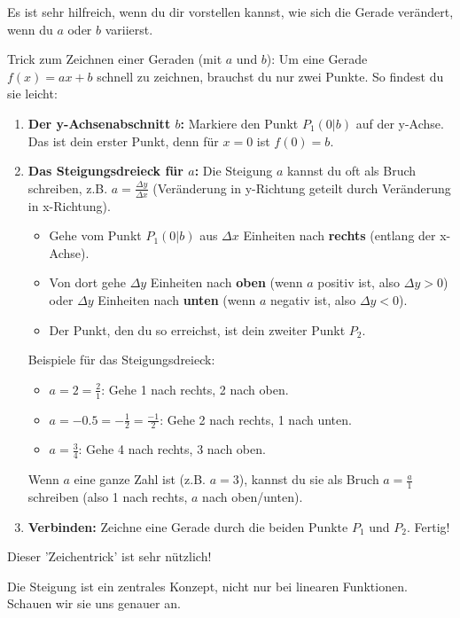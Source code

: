 Es ist sehr hilfreich, wenn du dir vorstellen kannst, wie sich die Gerade verändert, wenn du $a$ oder $b$ variierst.

\begin{infoboxumgebung}{Trick zum Zeichnen einer Geraden (mit $a$ und $b$):}
Um eine Gerade $f(x)=ax+b$ schnell zu zeichnen, brauchst du nur zwei Punkte. So findest du sie leicht:
\begin{enumerate}
    \item \textbf{Der y-Achsenabschnitt $b$:} Markiere den Punkt $P_1(0|b)$ auf der y-Achse. Das ist dein erster Punkt, denn für $x=0$ ist $f(0)=b$.
    \item \textbf{Das Steigungsdreieck für $a$:} Die Steigung $a$ kannst du oft als Bruch schreiben, z.B. $a = \frac{\Delta y}{\Delta x}$ (Veränderung in y-Richtung geteilt durch Veränderung in x-Richtung).
        \begin{itemize}
            \item Gehe vom Punkt $P_1(0|b)$ aus $\Delta x$ Einheiten nach \textbf{rechts} (entlang der x-Achse).
            \item Von dort gehe $\Delta y$ Einheiten nach \textbf{oben} (wenn $a$ positiv ist, also $\Delta y > 0$) oder $\Delta y$ Einheiten nach \textbf{unten} (wenn $a$ negativ ist, also $\Delta y < 0$).
            \item Der Punkt, den du so erreichst, ist dein zweiter Punkt $P_2$.
        \end{itemize}
        Beispiele für das Steigungsdreieck:
        \begin{itemize}
            \item $a = 2 = \frac{2}{1}$: Gehe 1 nach rechts, 2 nach oben.
            \item $a = -0.5 = -\frac{1}{2} = \frac{-1}{2}$: Gehe 2 nach rechts, 1 nach unten.
            \item $a = \frac{3}{4}$: Gehe 4 nach rechts, 3 nach oben.
        \end{itemize}
        Wenn $a$ eine ganze Zahl ist (z.B. $a=3$), kannst du sie als Bruch $a = \frac{a}{1}$ schreiben (also 1 nach rechts, $a$ nach oben/unten).
    \item \textbf{Verbinden:} Zeichne eine Gerade durch die beiden Punkte $P_1$ und $P_2$. Fertig!
\end{enumerate}
Dieser 'Zeichentrick' ist sehr nützlich!
\end{infoboxumgebung}

Die Steigung ist ein zentrales Konzept, nicht nur bei linearen Funktionen. Schauen wir sie uns genauer an.

